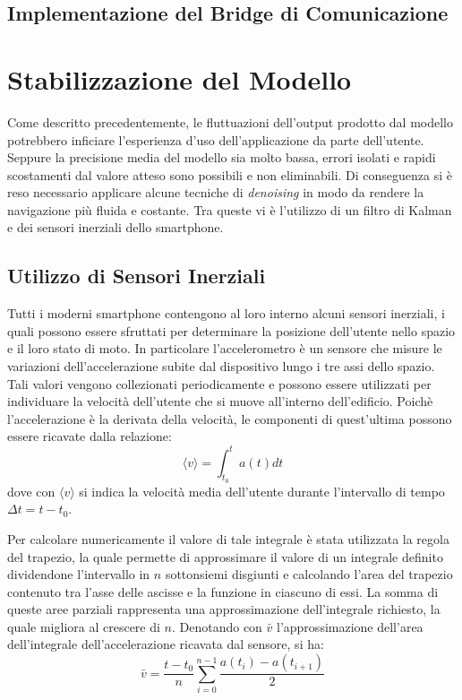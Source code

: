 \subsection{Implementazione del Bridge di Comunicazione}
\section{Stabilizzazione del Modello}
Come descritto precedentemente, le fluttuazioni dell'output prodotto dal
modello potrebbero inficiare l'esperienza d'uso dell'applicazione da parte
dell'utente. Seppure la precisione media del modello sia molto bassa, errori
isolati e rapidi scostamenti dal valore atteso sono possibili e non
eliminabili. Di conseguenza si è reso necessario applicare alcune tecniche di
\emph{denoising} in modo da rendere la navigazione più fluida e costante. Tra
queste vi è l'utilizzo di un filtro di Kalman e dei sensori inerziali dello
smartphone.
\subsection{Utilizzo di Sensori Inerziali}
Tutti i moderni smartphone contengono al loro interno alcuni sensori inerziali,
i quali possono essere sfruttati per determinare la posizione dell'utente nello
spazio e il loro stato di moto. In particolare l'accelerometro è un sensore che
misure le variazioni dell'accelerazione subite dal dispositivo lungo i tre assi
dello spazio. Tali valori vengono collezionati periodicamente e possono essere
utilizzati per individuare la velocità dell'utente che si muove all'interno
dell'edificio. Poichè l'accelerazione è la derivata della velocità, le
componenti di quest'ultima possono essere ricavate dalla relazione:
\[\langle v \rangle = \int_{t_0}^t{a(t) dt} \]
dove con \( \langle v \rangle \) si indica la velocità media dell'utente
durante l'intervallo di tempo \( \Delta t = t - t_0 \).

Per calcolare numericamente il valore di tale integrale è stata utilizzata la
regola del trapezio, la quale permette di approssimare il valore di un
integrale definito dividendone l'intervallo in \(n\) sottonsiemi disgiunti e
calcolando l'area del trapezio contenuto tra l'asse delle ascisse e la funzione
in ciascuno di essi. La somma di queste aree parziali rappresenta una
approssimazione dell'integrale richiesto, la quale migliora al crescere di
\(n\). Denotando con \(\bar{v}\) l'approssimazione dell'area dell'integrale
dell'accelerazione ricavata dal sensore, si ha:
\[ \bar{v} = \frac{t - t_0}{n} \sum_{i=0}^{n-1} {\frac{a(t_i) - a(t_{i+1})}{2}} \]

